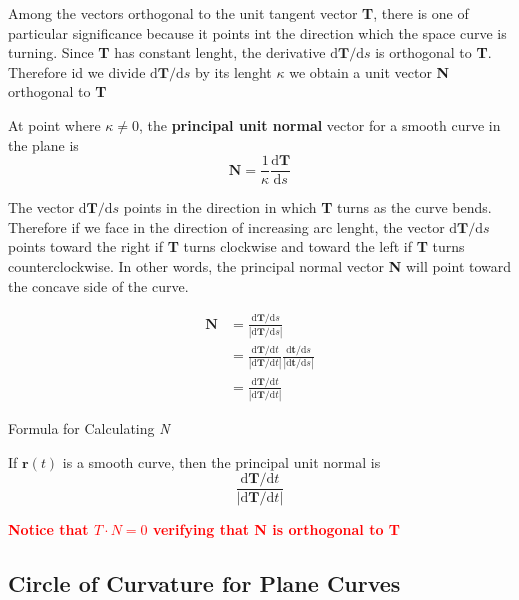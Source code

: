 \documentclass[12pt,a4paper]{article}
\newenvironment{definition}{\begin{definitionbox}}{\end{definitionbox}\vspace{1\baselineskip}}
\newenvironment{ruleBox}[1]{\begin{rulebox}{#1}}{\end{rulebox}\vspace{1\baselineskip}}
\begin{document}
Among the vectors orthogonal to the unit tangent vector \textbf{T}, there is one of particular significance because it points int the direction which the space curve is turning.
Since \textbf{T} has constant lenght, the derivative \(\mathrm{d}\mathbf{T}\slash\mathrm{d}s\) is orthogonal to \textbf{T}. Therefore id we divide \(\mathrm{d}\mathbf{T}\slash\mathrm{d}s\) by its lenght \(\kappa\) we obtain a unit vector \textbf{N} orthogonal to \textbf{T}

\begin{definition}
  At point where \(\kappa \neq 0\), the \textbf{principal unit normal} vector for a smooth curve in the plane is
  \[\mathbf{N} = \frac{1}{\kappa} \frac{\mathrm{d}\mathbf{T}}{\mathrm{d}s}\]
\end{definition}

The vector \(\mathrm{d}\mathbf{T}\slash\mathrm{d}s\) points in the direction in which \textbf{T} turns as the curve bends.
Therefore if we face in the direction of increasing arc lenght, the vector \(\mathrm{d}\mathbf{T}\slash\mathrm{d}s\) points toward the right if \textbf{T} turns clockwise and toward the left if \textbf{T} turns counterclockwise. In other words, the principal normal vector \textbf{N} will point toward the concave side of the curve.

\begin{align*}
  \mathbf{N} &= \frac{\mathrm{d}\mathbf{T}\slash\mathrm{d}s}{\left|\mathrm{d}\mathbf{T}\slash\mathrm{d}s\right|}\\
  &= \frac{\mathrm{d}\mathbf{T}\slash\mathrm{d}t}{\left|\mathrm{d}\mathbf{T}\slash\mathrm{d}t\right|} \frac{\mathrm{d}\mathbf{t}\slash\mathrm{d}s}{\left|\mathrm{d}\mathbf{t}\slash\mathrm{d}s\right|}\\
  &= \frac{\mathrm{d}\mathbf{T}\slash\mathrm{d}t}{\left|\mathrm{d}\mathbf{T}\slash\mathrm{d}t\right|}
\end{align*}

\begin{ruleBox}{Formula for Calculating \textit{N}}

If \(\mathbf{r}(t)\) is a smooth curve, then the principal unit normal is
\[ \frac{\mathrm{d}\mathbf{T}\slash\mathrm{d}t}{\left|\mathrm{d}\mathbf{T}\slash\mathrm{d}t\right|}
\]
  
\end{ruleBox}

\textcolor{red}{\textbf{Notice that \(T \cdot N = 0\) verifying that N is orthogonal to T}}

\subsection{Circle of Curvature for Plane Curves}
\end{document}
